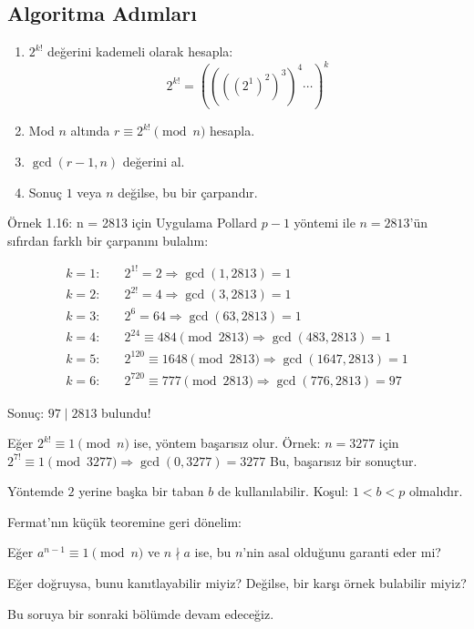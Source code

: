 \subsection*{Algoritma Adımları}

\begin{enumerate}
    \item $2^{k!}$ değerini kademeli olarak hesapla:
    \[
    2^{k!} = ((((2^1)^2)^3)^4 \cdots )^k
    \]
    \item Mod $n$ altında $r \equiv 2^{k!} \pmod{n}$ hesapla.
    \item $\gcd(r - 1, n)$ değerini al.
    \item Sonuç $1$ veya $n$ değilse, bu bir çarpandır.
\end{enumerate}

\begin{examplebox}{Örnek 1.16: n = 2813 için Uygulama}
Pollard $p - 1$ yöntemi ile $n = 2813$'ün sıfırdan farklı bir çarpanını bulalım:

\begin{align*}
k = 1: &\quad 2^{1!} = 2 \Rightarrow \gcd(1, 2813) = 1 \\
k = 2: &\quad 2^{2!} = 4 \Rightarrow \gcd(3, 2813) = 1 \\
k = 3: &\quad 2^6 = 64 \Rightarrow \gcd(63, 2813) = 1 \\
k = 4: &\quad 2^{24} \equiv 484 \pmod{2813} \Rightarrow \gcd(483, 2813) = 1 \\
k = 5: &\quad 2^{120} \equiv 1648 \pmod{2813} \Rightarrow \gcd(1647, 2813) = 1 \\
k = 6: &\quad 2^{720} \equiv 777 \pmod{2813} \Rightarrow \gcd(776, 2813) = \boxed{97}
\end{align*}

Sonuç: $97 \mid 2813$ bulundu!
\end{examplebox}

\begin{warningbox}
Eğer $2^{k!} \equiv 1 \pmod{n}$ ise, yöntem başarısız olur.  
Örnek: $n = 3277$ için $2^{7!} \equiv 1 \pmod{3277} \Rightarrow \gcd(0, 3277) = 3277$  
Bu, başarısız bir sonuçtur.
\end{warningbox}

\begin{highlightbox}
Yöntemde $2$ yerine başka bir taban $b$ de kullanılabilir.  
Koşul: $1 < b < p$ olmalıdır.
\end{highlightbox}

\begin{discussionbox}
Fermat'nın küçük teoremine geri dönelim:

Eğer $a^{n-1} \equiv 1 \pmod{n}$ ve $n \nmid a$ ise, bu $n$'nin asal olduğunu garanti eder mi?

Eğer doğruysa, bunu kanıtlayabilir miyiz?  
Değilse, bir karşı örnek bulabilir miyiz?

Bu soruya bir sonraki bölümde devam edeceğiz.
\end{discussionbox}

